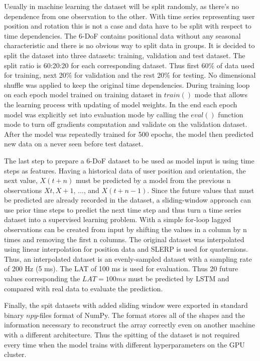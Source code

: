 Usually in machine learning the dataset will be split randomly, as there’s no dependence from one observation to the other. With time series representing user position and rotation this is not a case and data have to be split with respect to time dependencies. The 6-DoF contains positional data without any seasonal characteristic and there is no obvious way to split data in groups. It is decided to split the dataset into three datasets: training, validation and test dataset. The split ratio is 60:20:20 for each corresponding dataset. Thus first 60\% of data used for training, next 20\% for validation and the rest 20\% for testing. No dimensional shuffle was applied to keep the original time dependencies. During training loop on each epoch model trained on training dataset in $train()$ mode that allows the learning process with updating of model weights. In the end each epoch model was explicitly set into evaluation mode by calling the $eval()$ function mode to turn off gradients computation and validate on the validation dataset. After the model was repeatedly trained for 500 epochs, the model then predicted new data on a never seen before test dataset.

The last step to prepare a 6-DoF dataset to be used as model input is using time steps as features. Having a historical data of user position and orientation, the next value, $X(t+n)$ must be predicted by a model from the previous n observations $Xt, X+1$, ..., and $X(t+n-1)$. Since the future values that must be predicted are already recorded in the dataset, a sliding-window approach can use prior time steps to predict the next time step and thus turn a time series dataset into a supervised learning problem. With a simple for-loop lagged observations can be created from input by shifting the values in a column by n times and removing the first n columns. The original dataset was interpolated using linear interpolation for position data and SLERP is used for quaternions. Thus, an interpolated dataset is an evenly-sampled dataset with a sampling rate of 200 Hz (5 ms). The LAT of 100 ms is used for evaluation. Thus 20 future values corresponding the $LAT = 100 ms$ must be predicted by LSTM and compared with real data to evaluate the prediction. 

Finally, the spit datasets with added sliding window were exported in standard binary $npy$-files format of NumPy. The format stores all of the shapes and the information necessary to reconstruct the array correctly even on another machine with a different architecture. Thus the spitting of the dataset is not required every time when the model trains with different hyperparameters on the GPU cluster.
 
